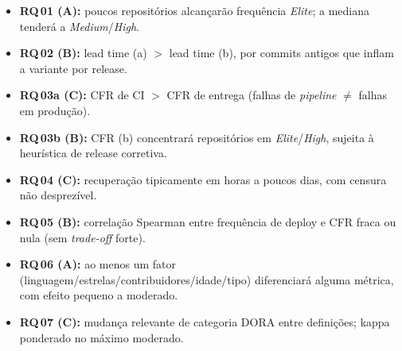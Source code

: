 \begin{itemize}
  \item \textbf{RQ\,01 (A):} poucos repositórios alcançarão frequência
    \textit{Elite}; a mediana tenderá a \textit{Medium}/\textit{High}.
  \item \textbf{RQ\,02 (B):} lead time (a) $>$ lead time (b), por commits
    antigos que inflam a variante por release.
  \item \textbf{RQ\,03a (C):} CFR de CI $>$ CFR de entrega (falhas de
    \textit{pipeline} $\neq$ falhas em produção).
  \item \textbf{RQ\,03b (B):} CFR (b) concentrará repositórios em
    \textit{Elite}/\textit{High}, sujeita à heurística de release corretiva.
  \item \textbf{RQ\,04 (C):} recuperação tipicamente em horas a poucos dias, com
    censura não desprezível.
  \item \textbf{RQ\,05 (B):} correlação Spearman entre frequência de deploy e CFR
    fraca ou nula (sem \textit{trade-off} forte).
  \item \textbf{RQ\,06 (A):} ao menos um fator
    (linguagem/estrelas/contribuidores/idade/tipo) diferenciará alguma métrica,
    com efeito pequeno a moderado.
  \item \textbf{RQ\,07 (C):} mudança relevante de categoria DORA entre
    definições; kappa ponderado no máximo moderado.
\end{itemize}

